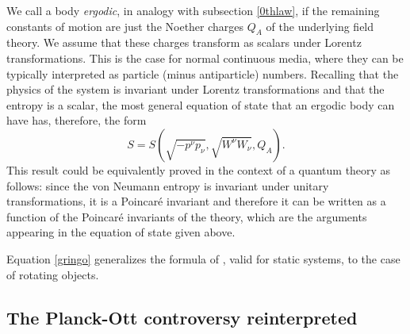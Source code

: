 \documentclass[twocolumn,usenatbib]{mnras2}
\begin{document}
We call a body \textit{ergodic}, in analogy with subsection \ref{0thlaw}, if the remaining constants of motion are just the Noether charges $Q_A$ of the underlying field theory. We assume that these charges transform as scalars under Lorentz transformations. This is the case for normal continuous media, where they can be typically interpreted as particle (minus antiparticle) numbers. Recalling that the physics of the system is invariant under Lorentz transformations and that the entropy is a scalar, the most general equation of state that an ergodic body can have has, therefore, the form
\begin{equation}\label{gringo}
S = S(\sqrt{-p^\nu p_\nu}, \sqrt{W^\nu W_\nu},Q_A).
\end{equation}
This result could be equivalently proved in the context of a quantum theory as follows: since the von Neumann entropy is invariant under unitary transformations, it is a Poincar\'{e} invariant and therefore it can be written as a function of the Poincar\'{e} invariants of the theory, which are the arguments appearing in the equation of state given above.

Equation \eqref{gringo} generalizes the formula of \cite{Noto_full}, valid for static systems, to the case of rotating objects.



\subsection{The Planck-Ott controversy reinterpreted}
\end{document}
